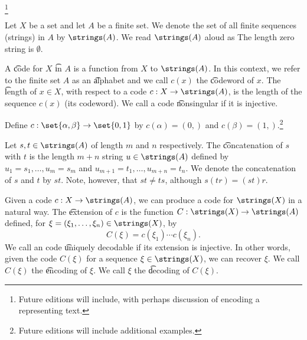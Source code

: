 
\footnote{Future editions will include, with perhaps discussion of encoding a representing text.}


Let $X$ be a set and let $A$ be a finite set.
We denote the set of all finite sequences (strings) in $A$ by $\strings(A)$.
We read $\strings(A)$ aloud as 
The length zero string is $\emptyset$.

A \t{code} for $X$ \t{in} $A$ is a function from $X$ to $\strings(A)$.
In this context, we refer to the finite set $A$ as an \t{alphabet} and we call $c(x)$ the \t{codeword} of $x$.
The \t{length} of $x \in X$, with respect to a code $c: X \to \strings(A)$, is the length of the sequence $c(x)$ (its codeword).
We call a code \t{nonsingular} if it is injective.


Define $c: \set{\alpha, \beta} \to \set{0, 1}$ by $c(\alpha) = (0,)$ and $c(\beta) = (1,)$.\footnote{Future editions will include additional examples.}



Let $s,t \in \strings(A)$ of length $m$  and $n$ respectively.
The \t{concatenation} of $s$ with $t$ is the length $m+n$ string $u \in \strings(A)$ defined by $u_{1} = s_1, \dots, u_m = s_m$ and $u_{m+1} = t_1, \dots, u_{m+n} = t_n$.
We denote the concatenation of $s$ and $t$ by $st$.
Note, however, that $st \neq ts$, although $s(tr) = (st)r$.

Given a code $c: X \to \strings(A)$, we can produce a code for $\strings(X)$ in a natural way.
The \t{extension} of $c$ is the function $C: \strings(X) \to \strings(A)$ defined, for $\xi = (\xi_1, \dots, \xi_n) \in \strings(X)$, by
\[
  C(\xi) = c(\xi_1) \cdots c(\xi_n).
\]
We call an code \t{uniquely decodable} if its extension is injective.
In other words, given the code $C(\xi)$ for a sequence $\xi \in \strings(X)$, we can recover $\xi$.
We call $C(\xi)$ the \t{encoding} of $\xi$.
We call $\xi$ the \t{decoding} of $C(\xi)$.


